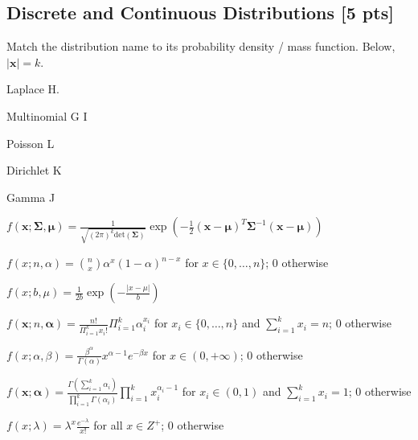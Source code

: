 \documentclass[a4paper]{article}
\theoremstyle{definition}
\newcommand{\vc}[1]{\boldsymbol{#1}}
\newcommand{\xv}{\vc{x}}
\newcommand{\Sigmav}{\vc{\Sigma}}
\newcommand{\alphav}{\vc{\alpha}}
\newcommand{\muv}{\vc{\mu}}
\newenvironment{soln}{
    \leavevmode\color{blue}\ignorespaces
}{}
\begin{document}
\subsection{Discrete and Continuous Distributions [5 pts]}
Match the distribution name to its probability density / mass
function. Below, $|\xv| = k$.
\begin{enumerate}[(a)]
\begin{minipage}{0.3\linewidth}
    \item Laplace \begin{soln}  H. \end{soln}
    \item Multinomial \begin{soln} G I\end{soln}
    \item Poisson \begin{soln}  L  \end{soln} 
    \item Dirichlet \begin{soln}  K \end{soln}
    \item Gamma \begin{soln}  J\end{soln}
\end{minipage}
\begin{minipage}{0.5\linewidth}
    \item $f(\xv; \Sigmav, \muv) = \frac{1}{\sqrt{(2\pi)^k \mathrm{det}(\Sigmav) }} \exp\left( -\frac{1}{2}
        (\xv - \muv)^T \Sigmav^{-1} (\xv - \muv)  \right)$
    \item $f(x; n, \alpha) = \binom{n}{x} \alpha^x (1 - \alpha)^{n-x}$
      for $x \in \{0,\ldots, n\}$; $0$ otherwise
    \item $f(x; b, \mu) = \frac{1}{2b} \exp\left( - \frac{|x - \mu|}{b} \right)$
    \item $f(\xv; n, \alphav) = \frac{n!}{\Pi_{i=1}^k x_i!}
      \Pi_{i=1}^k \alpha_i^{x_i}$ for $x_i \in \{0,\ldots,n\}$ and
      $\sum_{i=1}^k x_i = n$; $0$ otherwise
    \item $f(x; \alpha, \beta) = \frac{\beta^{\alpha}}{\Gamma(\alpha)} x^{\alpha -
        1}e^{-\beta x}$ for $x \in (0,+\infty)$; $0$ otherwise
    \item $f(\xv; \alphav) = \frac{\Gamma(\sum_{i=1}^k
        \alpha_i)}{\prod_{i=1}^k \Gamma(\alpha_i)} \prod_{i=1}^{k}
      x_i^{\alpha_i - 1}$ for $x_i \in (0,1)$ and $\sum_{i=1}^k x_i =
      1$; 0 otherwise
    \item $f(x; \lambda) = \lambda^x \frac{e^{-\lambda}}{x!}$ for all
      $x \in Z^+$; $0$ otherwise
\end{minipage}
\end{enumerate}
        
\end{document}
